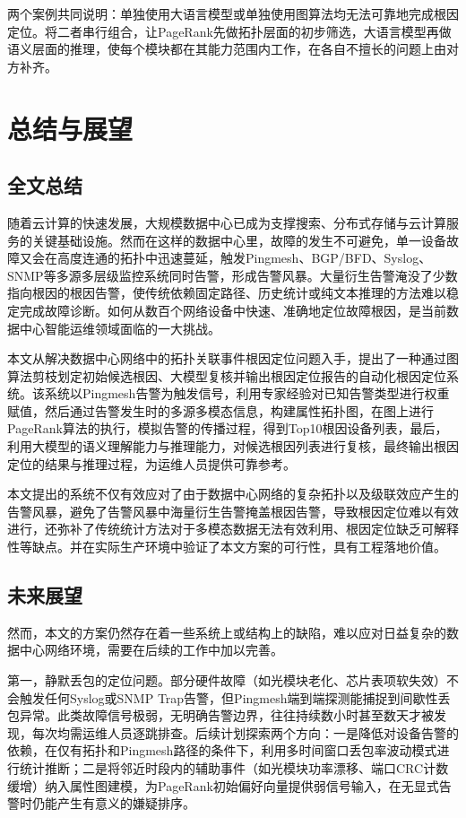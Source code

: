 两个案例共同说明：单独使用大语言模型或单独使用图算法均无法可靠地完成根因定位。将二者串行组合，让PageRank先做拓扑层面的初步筛选，大语言模型再做语义层面的推理，使每个模块都在其能力范围内工作，在各自不擅长的问题上由对方补齐。



\chapter{总结与展望}
\section{全文总结}

随着云计算的快速发展，大规模数据中心已成为支撑搜索、分布式存储与云计算服务的关键基础设施。然而在这样的数据中心里，故障的发生不可避免，单一设备故障又会在高度连通的拓扑中迅速蔓延，触发Pingmesh、BGP/BFD、Syslog、SNMP等多源多层级监控系统同时告警，形成告警风暴。大量衍生告警淹没了少数指向根因的根因告警，使传统依赖固定路径、历史统计或纯文本推理的方法难以稳定完成故障诊断。如何从数百个网络设备中快速、准确地定位故障根因，是当前数据中心智能运维领域面临的一大挑战。

本文从解决数据中心网络中的拓扑关联事件根因定位问题入手，提出了一种通过图算法剪枝划定初始候选根因、大模型复核并输出根因定位报告的自动化根因定位系统。该系统以Pingmesh告警为触发信号，利用专家经验对已知告警类型进行权重赋值，然后通过告警发生时的多源多模态信息，构建属性拓扑图，在图上进行PageRank算法的执行，模拟告警的传播过程，得到Top10根因设备列表，最后，利用大模型的语义理解能力与推理能力，对候选根因列表进行复核，最终输出根因定位的结果与推理过程，为运维人员提供可靠参考。

本文提出的系统不仅有效应对了由于数据中心网络的复杂拓扑以及级联效应产生的告警风暴，避免了告警风暴中海量衍生告警掩盖根因告警，导致根因定位难以有效进行，还弥补了传统统计方法对于多模态数据无法有效利用、根因定位缺乏可解释性等缺点。并在实际生产环境中验证了本文方案的可行性，具有工程落地价值。

\section{未来展望}

然而，本文的方案仍然存在着一些系统上或结构上的缺陷，难以应对日益复杂的数据中心网络环境，需要在后续的工作中加以完善。

第一，静默丢包的定位问题。部分硬件故障（如光模块老化、芯片表项软失效）不会触发任何Syslog或SNMP Trap告警，但Pingmesh端到端探测能捕捉到间歇性丢包异常。此类故障信号极弱，无明确告警边界，往往持续数小时甚至数天才被发现，每次均需运维人员逐跳排查。后续计划探索两个方向：一是降低对设备告警的依赖，在仅有拓扑和Pingmesh路径的条件下，利用多时间窗口丢包率波动模式进行统计推断；二是将邻近时段内的辅助事件（如光模块功率漂移、端口CRC计数缓增）纳入属性图建模，为PageRank初始偏好向量提供弱信号输入，在无显式告警时仍能产生有意义的嫌疑排序。

